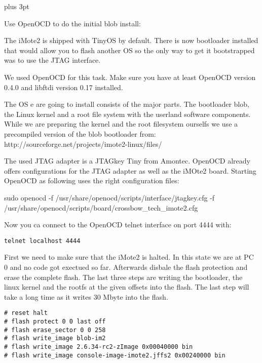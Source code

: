 \parindent=0pt                   %
\parskip=6pt plus 3pt            %

\label{annexopenocd}

Use OpenOCD to do the initial blob install:

The iMote2 is shipped with TinyOS by default. There is now bootloader installed
that would allow you to flash another OS so the only way to get it bootstrapped
was to use the JTAG interface.

We used OpenOCD for this task. Make sure you have at least OpenOCD version 0.4.0
and libftdi version 0.17 installed.

The OS e are going to install consists of the major parts. The bootloader blob, the
Linux kernel and a root file system with the userland software components. While
we are preparing the kernel and the root filesystem ourselfs we use a
precompiled version of the blob bootloader from:
http://sourceforge.net/projects/imote2-linux/files/

The used JTAG adapter is a JTAGkey Tiny from Amontec. OpenOCD already offers
configurations for the JTAG adapter as well as the iMOte2 board. Starting
OpenOCD as following uses the right configuration files:

sudo openocd -f /usr/share/openocd/scripts/interface/jtagkey.cfg -f \\
/usr/share/openocd/scripts/board/crossbow\_tech\_imote2.cfg

Now you ca connect to the OpenOCD telnet interface on port 4444 with:

\begin{verbatim}
telnet localhost 4444
\end{verbatim}

First we need to make sure that the iMote2 is halted. In this state we are at PC
0 and no code got exectued so far. Afterwards disbale the flash protection and
erase the complete flash. The last three steps are writing the bootloader, the
linux kernel and the rootfs at the given offsets into the flash. The last step
will take a long time as it writes 30 Mbyte into the flash.

\begin{verbatim}
# reset halt
# flash protect 0 0 last off
# flash erase_sector 0 0 258
# flash write_image blob-im2
# flash write_image 2.6.34-rc2-zImage 0x00040000 bin
# flash write_image console-image-imote2.jffs2 0x00240000 bin
\end{verbatim}

